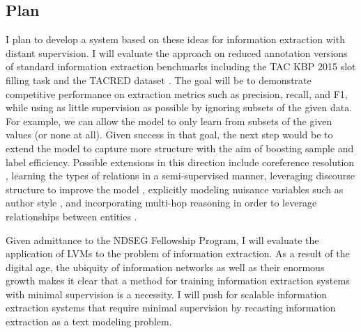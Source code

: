 \documentclass[12pt]{article}
\begin{document}
\subsection*{Plan}

I plan to develop a system based on these ideas for information extraction with distant supervision. I will evaluate the approach on reduced annotation versions of standard information extraction benchmarks including the TAC KBP 2015 slot filling task and the TACRED dataset \citep{zhang2017slotfilling}.
The goal will be to demonstrate competitive performance on
extraction metrics such as precision, recall, and F1, while using as little supervision
as possible by ignoring subsets of the given data.
For example, we can allow the model to only learn from
subsets of the given values (or none at all).
Given success in that goal, the next step would be to extend the model
to capture more structure with the aim of boosting sample and label efficiency.
Possible extensions in this direction include coreference resolution \citep{haghighi2010coref},
learning the types of relations in a semi-supervised manner,
leveraging discourse structure to improve the model
\citep{sauper2009wiki}, explicitly modeling nuisance variables such as
author style \citep{hsu2017speech}, and incorporating multi-hop
reasoning in order to leverage relationships between entities
\citep{chen2018diva,rock17prove}.

Given admittance to the NDSEG Fellowship Program, I will evaluate the application of
LVMs to the problem of information extraction.
As a result of the digital age, the ubiquity of information networks as well as their 
enormous growth makes it clear that a method for training information extraction systems
with minimal supervision is a necessity.
I will push for scalable information extraction systems that require minimal supervision
by recasting information extraction as a text modeling problem.
\end{document}
